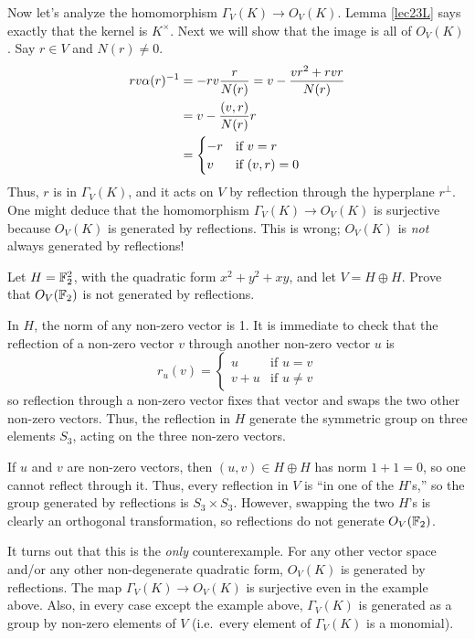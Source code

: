  Now let's analyze the homomorphism $\Gamma_V(K)\to O_V(K)$. Lemma \ref{lec23L} says
 exactly that the kernel is $K^\times$. Next we will show that the image is all of
 $O_V(K)$. Say $r\in V$ and $N(r)\neq 0$.
 \begin{align}
   r v\alpha(r)^{-1} &= -rv\frac{r}{N(r)} = v - \frac{vr^2+rvr}{N(r)} \notag\\
    &= v - \frac{(v,r)}{N(r)}r \label{lec23star}\\
    &= \begin{cases}
       -r &\text{if }v=r\\
        v &\text{if }(v,r)=0
    \end{cases}
 \end{align}
 Thus, $r$ is in $\Gamma_V(K)$, and it acts on $V$ by reflection through the hyperplane
 $r^\perp$. One might deduce that the homomorphism $\Gamma_V(K)\to O_V(K)$ is surjective
 because $O_V(K)$ is generated by reflections. This is wrong; $O_V(K)$ is \emph{not}
 always generated  by reflections!
 \begin{exercise}
   Let $H=\mathbb{F}_2^2$, with the quadratic form $x^2+y^2+xy$, and let $V=H\oplus H$. Prove
   that $O_V(\mathbb{F}_2)$ is not generated by reflections.
   \begin{solution}
     In $H$, the norm of any non-zero vector is 1. It is immediate to check that the
     reflection of a non-zero vector $v$ through another non-zero vector $u$ is
     \[
        r_u(v) = \begin{cases}
          u &\text{if }u=v\\
          v+u & \text{if }u\ne v
        \end{cases}
     \]
     so reflection through a non-zero vector fixes that vector and swaps the two other
     non-zero vectors. Thus, the reflection in $H$ generate the symmetric group on three
     elements $S_3$, acting on the three non-zero vectors.

     If $u$ and $v$ are non-zero vectors, then $(u,v)\in H\oplus H$ has norm $1+1=0$, so
     one cannot reflect through it. Thus, every reflection in $V$ is ``in one of the
     $H$'s,'' so the group generated by reflections is $S_3\times S_3$. However,
     swapping the two $H$'s is clearly an  orthogonal transformation, so reflections do
     not generate $O_V(\mathbb{F}_2)$.
   \end{solution}
 \end{exercise}
 \begin{remark}\label{lec23Rmk:allOK}
   It turns out that this is the \emph{only} counterexample. For any other vector space
   and/or any other non-degenerate quadratic form, $O_V(K)$ is generated by reflections.
   The map $\Gamma_V(K)\to O_V(K)$ is surjective even in the example above. Also, in
   every case except the example above, $\Gamma_V(K)$ is generated as a group by non-zero
   elements of $V$ (i.e.\ every element of $\Gamma_V(K)$ is a monomial).
 \end{remark}

